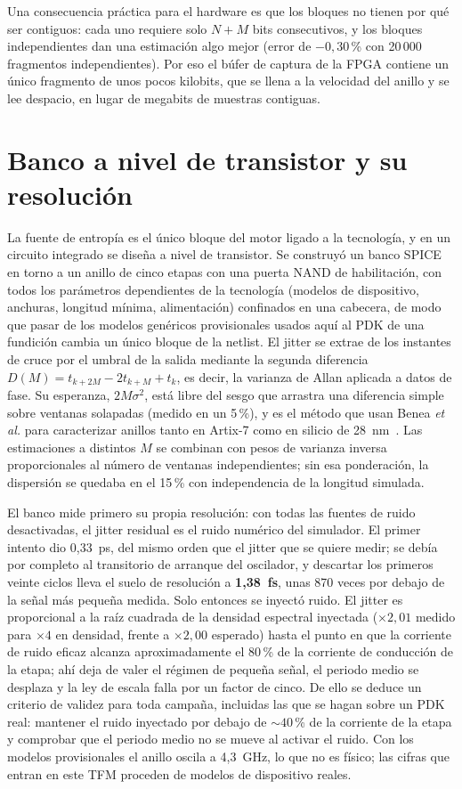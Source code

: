 Una consecuencia práctica para el hardware es que los bloques no tienen por
qué ser contiguos: cada uno requiere solo $N+M$ bits consecutivos, y los
bloques independientes dan una estimación algo mejor (error de
$-0{,}30$\,\% con 20\,000 fragmentos independientes). Por eso el búfer de
captura de la FPGA contiene un único fragmento de unos pocos kilobits, que
se llena a la velocidad del anillo y se lee despacio, en lugar de megabits
de muestras contiguas.

\section{Banco a nivel de transistor y su resolución}
\label{sec:spice}

La fuente de entropía es el único bloque del motor ligado a la tecnología,
y en un circuito integrado se diseña a nivel de transistor. Se construyó
un banco SPICE en torno a un anillo de cinco etapas con una puerta NAND de
habilitación, con todos los parámetros dependientes de la tecnología
(modelos de dispositivo, anchuras, longitud mínima, alimentación)
confinados en una cabecera, de modo que pasar de los modelos genéricos
provisionales usados aquí al \ac{PDK} de una fundición cambia un único
bloque de la netlist. El jitter se extrae de los instantes de cruce por el
umbral de la salida mediante la segunda diferencia
$D(M) = t_{k+2M} - 2t_{k+M} + t_k$, es decir, la varianza de Allan
aplicada a datos de fase. Su esperanza, $2M\sigma^2$, está libre del sesgo
que arrastra una diferencia simple sobre ventanas solapadas (medido en un
5\,\%), y es el método que usan Benea \emph{et al.} para caracterizar
anillos tanto en Artix-7 como en silicio de 28~nm~\cite{benea_2024_flicker}.
Las estimaciones a distintos $M$ se combinan con pesos de varianza inversa
proporcionales al número de ventanas independientes; sin esa ponderación,
la dispersión se quedaba en el 15\,\% con independencia de la longitud
simulada.

El banco mide primero su propia resolución: con todas las fuentes de ruido
desactivadas, el jitter residual es el ruido numérico del simulador. El
primer intento dio 0,33~ps, del mismo orden que el jitter que se quiere
medir; se debía por completo al transitorio de arranque del oscilador, y
descartar los primeros veinte ciclos lleva el suelo de resolución a
\textbf{1,38~fs}, unas 870 veces por debajo de la señal más pequeña
medida. Solo
entonces se inyectó ruido. El jitter es proporcional a la raíz cuadrada de
la densidad espectral inyectada ($\times2{,}01$ medido para $\times4$ en
densidad, frente a $\times2{,}00$ esperado) hasta el punto en que la
corriente de ruido eficaz alcanza aproximadamente el 80\,\% de la
corriente de conducción de la etapa; ahí deja de valer el régimen de
pequeña señal, el periodo medio se desplaza y la ley de escala falla por
un factor de cinco. De ello se deduce un criterio de validez para toda
campaña, incluidas las que se hagan sobre un \ac{PDK} real: mantener el
ruido inyectado por debajo de $\sim40$\,\% de la corriente de la etapa y
comprobar que el periodo medio no se mueve al activar el ruido. Con los
modelos provisionales el anillo oscila a 4,3~GHz, lo que no es físico; las
cifras que entran en este TFM proceden de modelos de dispositivo reales.

